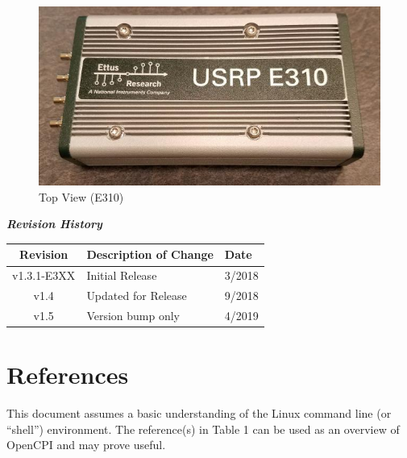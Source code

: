 \maketitle
\begin{figure}[H]
 \centering
 \includegraphics[scale=0.9]{img/top.jpg}
 \caption{Top View (E310)}
 \label{fig:top}
\end{figure}
\newpage

	\begin{center}
	\textit{\textbf{Revision History}}
		\begin{table}[H]
		\label{table:revisions} %
			\begin{tabularx}{\textwidth}{|c|X|l|}
			\hline
			\rowcolor{blue}
			\textbf{Revision} & \textbf{Description of Change} & \textbf{Date} \\
		    \hline
		    v1.3.1-E3XX & Initial Release & 3/2018 \\
			\hline
		    v1.4 & Updated for Release & 9/2018 \\
			\hline
		    v1.5 & Version bump only & 4/2019 \\
			\hline
			\end{tabularx}
		\end{table}
	\end{center}

\newpage

\tableofcontents

\newpage

\section{References}
	This document assumes a basic understanding of the Linux command line (or ``shell'') environment.  The reference(s) in Table 1 can be used as an overview of OpenCPI and may prove useful.


